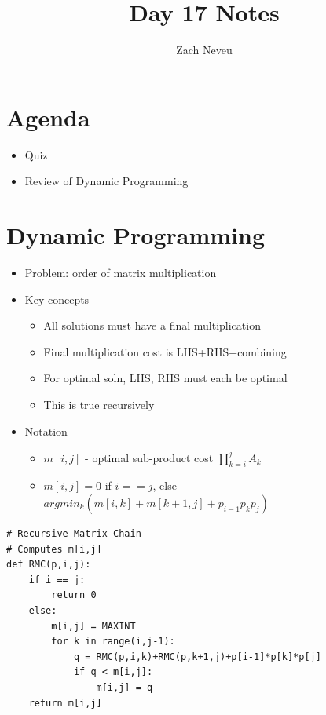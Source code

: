 \documentclass[12pt, letter]{article}
\author{Zach Neveu}
\title{ Day 17 Notes }
\begin{document}
\maketitle
\section{Agenda}%
\label{sec:agenda}

\begin{itemize}
	\item Quiz
	\item Review of Dynamic Programming
\end{itemize}

\section{Dynamic Programming}%
\label{sec:dynamic_programming}
\begin{itemize}
	\item Problem: order of matrix multiplication
	\item Key concepts
	\begin{itemize}
		\item All solutions must have a final multiplication
		\item Final multiplication cost is LHS+RHS+combining
		\item For optimal soln, LHS, RHS must each be optimal
		\item This is true recursively
	\end{itemize}
	\item Notation
	\begin{itemize}
		\item $m[i,j]$ - optimal sub-product cost $\prod_{k=i}^j A_k$
		\item $m[i,j] = 0$ if  $i==j$, else $argmin_k(m[i,k]+m[k+1,j]+p_{i-1}p_kp_j)$
	\end{itemize}
\end{itemize}

\begin{verbatim}
# Recursive Matrix Chain
# Computes m[i,j]
def RMC(p,i,j):
    if i == j:
        return 0
    else:
        m[i,j] = MAXINT
        for k in range(i,j-1):
            q = RMC(p,i,k)+RMC(p,k+1,j)+p[i-1]*p[k]*p[j]
            if q < m[i,j]:
                m[i,j] = q
    return m[i,j]
\end{verbatim}
\end{document}
